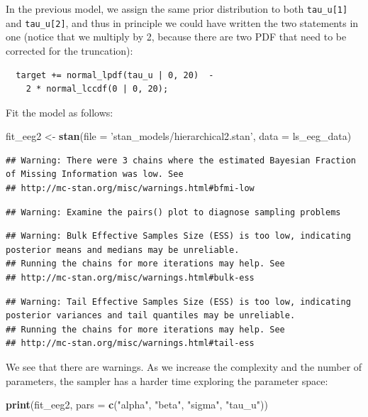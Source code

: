 \documentclass[12pt,]{krantz}
\newenvironment{Shaded}{\begin{snugshade}}{\end{snugshade}}
\newcommand{\DataTypeTok}[1]{\textcolor[rgb]{0.13,0.29,0.53}{#1}}
\newcommand{\KeywordTok}[1]{\textcolor[rgb]{0.13,0.29,0.53}{\textbf{#1}}}
\newcommand{\NormalTok}[1]{#1}
\newcommand{\StringTok}[1]{\textcolor[rgb]{0.31,0.60,0.02}{#1}}
\theoremstyle{definition}
\theoremstyle{definition}
\theoremstyle{definition}
\theoremstyle{remark}
\begin{document}
In the previous model, we assign the same prior distribution to both \texttt{tau\_u{[}1{]}} and \texttt{tau\_u{[}2{]}}, and thus in principle we could have written the two statements in one (notice that we multiply by 2, because there are two PDF that need to be corrected for the truncation):

\begin{verbatim}
  target += normal_lpdf(tau_u | 0, 20)  - 
    2 * normal_lccdf(0 | 0, 20);
\end{verbatim}

Fit the model as follows:

\begin{Shaded}
\begin{Highlighting}[]
\NormalTok{fit_eeg2 <-}\StringTok{ }\KeywordTok{stan}\NormalTok{(}\DataTypeTok{file =} \StringTok{'stan_models/hierarchical2.stan'}\NormalTok{, }
                 \DataTypeTok{data =}\NormalTok{ ls_eeg_data)}
\end{Highlighting}
\end{Shaded}

\begin{verbatim}
## Warning: There were 3 chains where the estimated Bayesian Fraction of Missing Information was low. See
## http://mc-stan.org/misc/warnings.html#bfmi-low
\end{verbatim}

\begin{verbatim}
## Warning: Examine the pairs() plot to diagnose sampling problems
\end{verbatim}

\begin{verbatim}
## Warning: Bulk Effective Samples Size (ESS) is too low, indicating posterior means and medians may be unreliable.
## Running the chains for more iterations may help. See
## http://mc-stan.org/misc/warnings.html#bulk-ess
\end{verbatim}

\begin{verbatim}
## Warning: Tail Effective Samples Size (ESS) is too low, indicating posterior variances and tail quantiles may be unreliable.
## Running the chains for more iterations may help. See
## http://mc-stan.org/misc/warnings.html#tail-ess
\end{verbatim}

We see that there are warnings. As we increase the complexity and the number of parameters, the sampler has a harder time exploring the parameter space:

\begin{Shaded}
\begin{Highlighting}[]
\KeywordTok{print}\NormalTok{(fit_eeg2, }\DataTypeTok{pars =} \KeywordTok{c}\NormalTok{(}\StringTok{"alpha"}\NormalTok{, }\StringTok{"beta"}\NormalTok{, }\StringTok{"sigma"}\NormalTok{, }\StringTok{"tau_u"}\NormalTok{))}
\end{Highlighting}
\end{Shaded}
\end{document}

